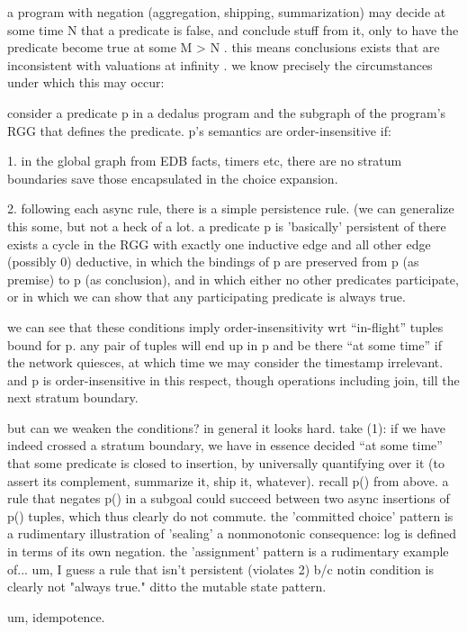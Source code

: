 a program with negation (aggregation, shipping, summarization) may decide at some time N
that a predicate is false, and conclude stuff from it, only to have the predicate become
true at some M > N .  this means conclusions exists that are inconsistent with valuations at
infinity .  we know precisely the circumstances under which this may occur:

consider a predicate p in a dedalus program and the subgraph of the program's RGG that 
defines the predicate.  p's semantics are order-insensitive if:

1. in the global graph from EDB facts, timers etc, there are no stratum boundaries save those encapsulated in the choice expansion.

2. following each async rule, there is a simple persistence rule.  (we can generalize this some,
but not a heck of a lot.  a predicate p is 'basically' persistent of there exists a cycle in the RGG 
with exactly one inductive edge and all other edge (possibly 0) deductive, in which the 
bindings of p are preserved from p (as premise) to p (as conclusion), and in which either no other predicates participate, or in which we can show that any participating predicate is always true.

we can see that these conditions imply order-insensitivity wrt ``in-flight'' tuples bound for p.
any pair of tuples will end up in p and be there ``at some time'' if the network quiesces, at 
which time we may consider the timestamp irrelevant.  and p is order-insensitive in this respect,
though operations including join, till the next stratum boundary.

but can we weaken the conditions?  in general it looks hard.  take (1): if we have indeed crossed a stratum boundary, we have in essence decided ``at some time'' that some predicate is closed to insertion, by universally quantifying over it (to assert its complement, summarize it, ship it, whatever).  recall p() from above.  a rule that negates p() in a subgoal could succeed between 
two async insertions of p() tuples, which thus clearly do not commute.  the 'committed choice'
pattern is a rudimentary illustration of 'sealing' a nonmonotonic consequence: log is defined 
in terms of its own negation.  the 'assignment' pattern is a rudimentary example of... um, I guess a rule that isn't persistent (violates 2) b/c notin condition is clearly not "always true."  ditto the
mutable state pattern.




um, idempotence.

